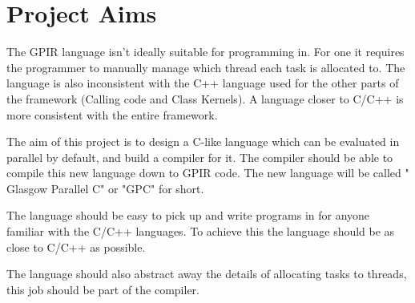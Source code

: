 \section{Project Aims}

The GPIR language isn't ideally suitable for programming in. For one it requires the programmer to manually
manage which thread each task is allocated to. The language is also inconsistent with the C++ language used for 
the other parts of the framework (Calling code and Class Kernels). A language closer to C/C++ is more
consistent with the entire framework.

The aim of this project is to design a C-like language which can be evaluated in parallel by default, and build
a compiler for it. The compiler should be able to compile this new language down to GPIR code. The new language will
be called " Glasgow Parallel C" or "GPC" for short.

The language should be easy to pick up and write programs in for anyone familiar with the C/C++ languages.
To achieve this the language should be as close to C/C++ as possible. 

The language should also abstract away the details of allocating tasks to threads, this job
should be part of the compiler.

